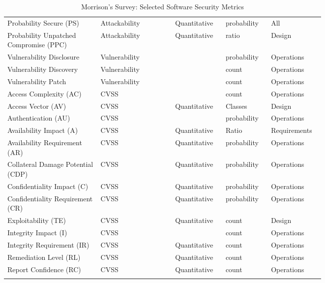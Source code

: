\begin{tiny}
\begin{longtable}{@{}p{0.25\linewidth}p{0.15\linewidth}p{0.05\linewidth}p{0.1\linewidth}p{0.1\linewidth}p{0.1\linewidth}@{}}
Probability Secure (PS) & Attackability & \cite{Marconato_Kaaniche_Nicomette_2013} & Quantitative & probability & All \\
Probability Unpatched Compromise (PPC) & Attackability & \cite{Marconato_Kaaniche_Nicomette_2013} & Quantitative & ratio & Design \\
Vulnerability Disclosure & Vulnerability  & \cite{Marconato_Kaaniche_Nicomette_2013} &  & probability & Operations \\
Vulnerability Discovery & Vulnerability  & \cite{Marconato_Kaaniche_Nicomette_2013} &  & count & Operations \\
Vulnerability Patch & Vulnerability  & \cite{Marconato_Kaaniche_Nicomette_2013} &  & count & Operations \\
Access Complexity (AC) & CVSS  & \cite{Scarfone_Mell_2008} &  & count & Operations \\
Access Vector (AV) & CVSS  & \cite{Scarfone_Mell_2008} & Quantitative & Classes & Design \\
Authentication (AU) & CVSS  & \cite{Scarfone_Mell_2008} &  & probability & Operations \\
Availability Impact (A) & CVSS  & \cite{Scarfone_Mell_2008} & Quantitative & Ratio & Requirements \\
Availability Requirement (AR) & CVSS  & \cite{Scarfone_Mell_2008} & Quantitative & probability & Operations \\
Collateral Damage Potential (CDP) & CVSS  & \cite{Scarfone_Mell_2008} & Quantitative & probability & Operations \\
Confidentiality Impact (C) & CVSS  & \cite{Scarfone_Mell_2008} & Quantitative & probability & Operations \\
Confidentiality Requirement (CR) & CVSS  & \cite{Scarfone_Mell_2008} & Quantitative & probability & Operations \\
Exploitability (TE) & CVSS  & \cite{Scarfone_Mell_2008} & Quantitative & count & Design \\
Integrity Impact (I) & CVSS  & \cite{Scarfone_Mell_2008} &  & count & Operations \\
Integrity Requirement (IR) & CVSS  & \cite{Scarfone_Mell_2008} & Quantitative & count & Operations \\
Remediation Level (RL) & CVSS  & \cite{Scarfone_Mell_2008} & Quantitative & count & Operations \\
Report Confidence (RC) & CVSS  & \cite{Scarfone_Mell_2008} & Quantitative & count & Operations \\*
\caption{Morrison's Survey: Selected Software Security Metrics\cite{Morrison_Moye_Pandita_Williams_2018}}
\label{tab:morrison_metrics}\\
\end{longtable}
\end{tiny}


